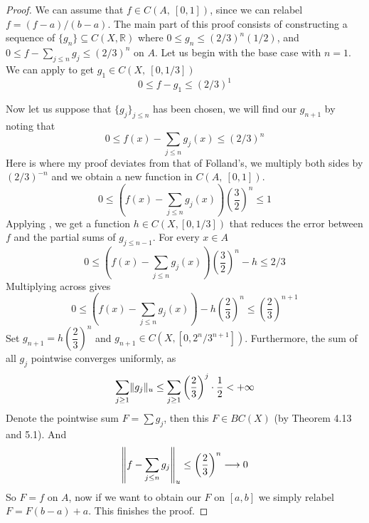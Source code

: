 \documentclass[../../main.tex]{subfiles}
\begin{document}
\begin{proof}
We can assume that $f\in C(A,\:[0,1])$, since we can relabel $f = (f-a)/(b-a)$. The main part of this proof consists of constructing a sequence of $\{g_n\}\subseteq C(X,\mathbb{R})$ where $0\leq g_n\leq (2/3)^n(1/2)$, and $0\leq f-\sum_{j\leq n}g_j\leq (2/3)^n$ on $A$. Let us begin with the base case with $n=1$. We can apply  to get $g_1\in C(X,\: [0,1/3])$
\[
0\leq f-g_1\leq (2/3)^1
\]

Now let us suppose that $\{g_j\}_{j\leq n}$ has been chosen, we will find our $g_{n+1}$ by noting that
\[
0\leq f(x)-\sum_{j\leq n}g_j(x)\leq (2/3)^n
\]
Here is where my proof deviates from that of Folland's, we multiply both sides by $(2/3)^{-n}$ and we obtain a new function in $C(A,\:[0,1])$.
\[
0\leq \left(f(x)-\sum_{j\leq n}g_j(x)\right)\left(\dfrac{3}{2}\right)^n\leq 1
\]
Applying , we get a function $h\in C(X,[0,1/3])$ that reduces the error between $f$ and the partial sums of $g_{j\leq n-1}$. For every $x\in A$
\[
0\leq \left(f(x)-\sum_{j\leq n}g_j(x)\right)\left(\dfrac{3}{2}\right)^n-h\leq 2/3
\]
Multiplying across gives
\[
0\leq \left(f(x)-\sum_{j\leq n}g_j(x)\right)-h\left(\dfrac{2}{3}\right)^n\leq \left(\dfrac{2}{3}\right)^{n+1}
\]
Set $g_{n+1} = h\left(\dfrac{2}{3}\right)^n$ and $g_{n+1}\in C(X, [0, 2^n/3^{n+1}])$. Furthermore, the sum of all $g_j$ pointwise converges uniformly, as
\[
\sum_{j\geq 1} \lVert {g_j} \rVert_u \leq \sum_{j\geq 1}\left(\dfrac{2}{3}\right)^j\cdot\dfrac{1}{2}<+\infty
\]
Denote the pointwise sum $F = \sum g_j$, then this $F\in BC(X)$ (by Theorem 4.13 and 5.1). And
\[
\left\lVert {f-\sum_{j\leq n}g_j} \right\rVert_u\leq \left(\dfrac{2}{3}\right)^n\longrightarrow 0
\]
So $F= f$ on $A$, now if we want to obtain our $F$ on $[a,b]$ we simply relabel $F = F(b-a) + a$. This finishes the proof.
\end{proof}
\end{document}
